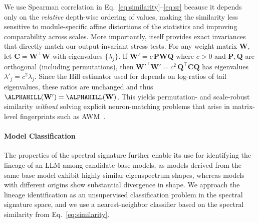 We use Spearman correlation in Eq.~\ref{eq:similarity}--\ref{eq:sr} because it depends only on the \emph{relative} depth-wise ordering of \ALPHAHILL values, making the similarity less sensitive to module-specific affine distortions of the statistics and improving comparability across scales.
More importantly, \ALPHAHILL itself provides exact invariances that directly match our output-invariant stress tests.
For any weight matrix $\mathbf{W}$, let $\mathbf{C}=\mathbf{W}^{\top}\mathbf{W}$ with eigenvalues $\{\lambda_j\}$.
If $\mathbf{W}' = c\,\mathbf{P}\mathbf{W}\mathbf{Q}$ where $c>0$ and $\mathbf{P},\mathbf{Q}$ are orthogonal (including permutations), then ${\mathbf{W}'}^{\!\top}\mathbf{W}' = c^2\,\mathbf{Q}^{\top}\mathbf{C}\mathbf{Q}$ has eigenvalues $\lambda'_j=c^2\lambda_j$.
Since the Hill estimator used for \ALPHAHILL depends on log-ratios of tail eigenvalues, these ratios are unchanged and thus $\ALPHAHILL(\mathbf{W}')=\ALPHAHILL(\mathbf{W})$.
This yields permutation- and scale-robust similarity \emph{without} solving explicit neuron-matching problems that arise in matrix-level fingerprints such as \textsc{AWM}~\cite{zeng2025awm}.







\paragraph{Model Classification}
The properties of the spectral signature further enable its use for identifying the lineage of an LLM among candidate base models, as models derived from the same base model exhibit highly similar eigenspectrum shapes, whereas models with different origins show substantial divergence in shape. We approach the lineage identification as an unsupervised classification problem in the spectral signature space, and we use a nearest-neighbor classifier based on the spectral similarity from Eq.~\ref{eq:similarity}.

